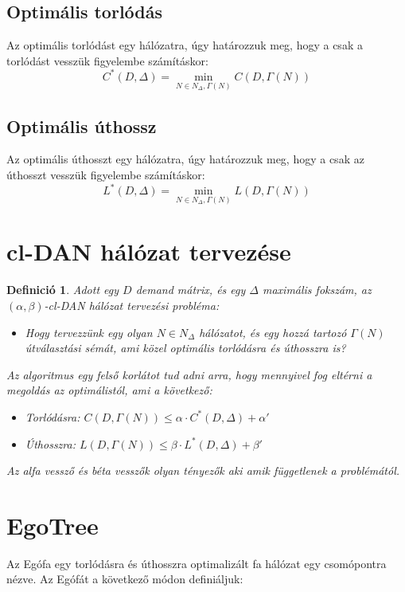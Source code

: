 \documentclass[12pt]{report}
\newtheorem{mydef}{Definició}
\begin{document}
\subsection{Optimális torlódás}


Az optimális torlódást egy  hálózatra, úgy határozzuk meg, hogy a csak a torlódást vesszük figyelembe számításkor: 
\[C^*(D, \Delta) = \min_{N \in N_\Delta, \Gamma(N)} C(D, \Gamma(N))\]


\subsection{Optimális úthossz}

Az optimális úthosszt egy  hálózatra, úgy határozzuk meg, hogy a csak az úthosszt vesszük figyelembe számításkor:
\[L^*(D, \Delta) = \min_{N \in N_\Delta, \Gamma(N)} L(D, \Gamma(N))\]

\section{cl-DAN hálózat tervezése}

\begin{mydef}
	Adott egy \(D\) demand mátrix, és egy \(\Delta\) maximális fokszám, az \((\alpha, \beta)\)-cl-DAN hálózat tervezési probléma:
	\begin{itemize}
		\item Hogy tervezzünk egy olyan \(N \in N_\Delta\) hálózatot, és egy hozzá tartozó \(\Gamma(N)\) útválasztási sémát, ami közel optimális torlódásra és úthosszra is?
	\end{itemize}
	
	Az algoritmus egy felső korlátot tud adni arra, hogy mennyivel fog eltérni a megoldás az optimálistól, ami a következő:
	\begin{itemize}
		\item Torlódásra: \(C(D, \Gamma(N)) \le \alpha \cdot C^*(D, \Delta) + \alpha'\)
		\item Úthosszra: \(L(D, \Gamma(N)) \le \beta \cdot L^*(D, \Delta) + \beta'\)
	\end{itemize}
	Az alfa vessző és béta vesszők olyan tényezők aki amik függetlenek a problémától.
\end{mydef}

\section{EgoTree}

Az Egófa egy torlódásra és úthosszra optimalizált fa hálózat egy csomópontra nézve.
Az Egófát a következő módon definiáljuk:
	
\end{document}
